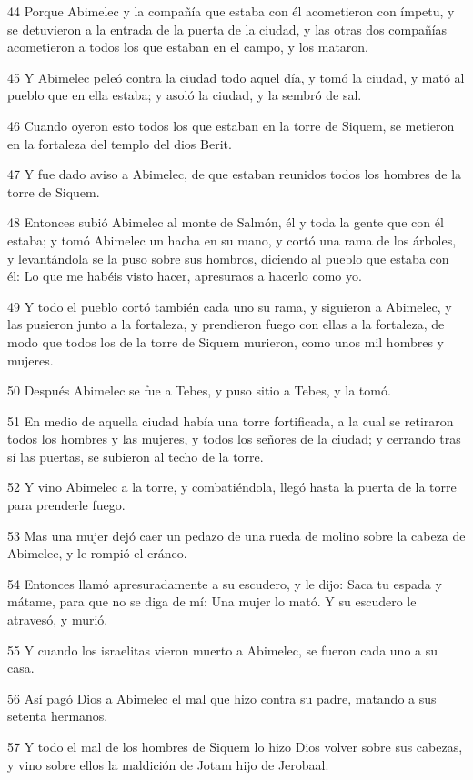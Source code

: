 \par 44 Porque Abimelec y la compañía que estaba con él acometieron con ímpetu, y se detuvieron a la entrada de la puerta de la ciudad, y las otras dos compañías acometieron a todos los que estaban en el campo, y los mataron.
\par 45 Y Abimelec peleó contra la ciudad todo aquel día, y tomó la ciudad, y mató al pueblo que en ella estaba; y asoló la ciudad, y la sembró de sal.
\par 46 Cuando oyeron esto todos los que estaban en la torre de Siquem, se metieron en la fortaleza del templo del dios Berit.
\par 47 Y fue dado aviso a Abimelec, de que estaban reunidos todos los hombres de la torre de Siquem.
\par 48 Entonces subió Abimelec al monte de Salmón, él y toda la gente que con él estaba; y tomó Abimelec un hacha en su mano, y cortó una rama de los árboles, y levantándola se la puso sobre sus hombros, diciendo al pueblo que estaba con él: Lo que me habéis visto hacer, apresuraos a hacerlo como yo.
\par 49 Y todo el pueblo cortó también cada uno su rama, y siguieron a Abimelec, y las pusieron junto a la fortaleza, y prendieron fuego con ellas a la fortaleza, de modo que todos los de la torre de Siquem murieron, como unos mil hombres y mujeres.
\par 50 Después Abimelec se fue a Tebes, y puso sitio a Tebes, y la tomó.
\par 51 En medio de aquella ciudad había una torre fortificada, a la cual se retiraron todos los hombres y las mujeres, y todos los señores de la ciudad; y cerrando tras sí las puertas, se subieron al techo de la torre.
\par 52 Y vino Abimelec a la torre, y combatiéndola, llegó hasta la puerta de la torre para prenderle fuego.
\par 53 Mas una mujer dejó caer un pedazo de una rueda de molino sobre la cabeza de Abimelec, y le rompió el cráneo.
\par 54 Entonces llamó apresuradamente a su escudero, y le dijo: Saca tu espada y mátame, para que no se diga de mí: Una mujer lo mató. Y su escudero le atravesó, y murió.
\par 55 Y cuando los israelitas vieron muerto a Abimelec, se fueron cada uno a su casa.
\par 56 Así pagó Dios a Abimelec el mal que hizo contra su padre, matando a sus setenta hermanos.
\par 57 Y todo el mal de los hombres de Siquem lo hizo Dios volver sobre sus cabezas, y vino sobre ellos la maldición de Jotam hijo de Jerobaal.

